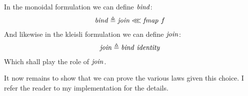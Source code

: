 In the monoidal formulation we can define $\mathit{bind}$:
%
\begin{align}
\mathit{bind} \mathrel{\triangleq} \mathit{join} \lll \mathit{fmap}\ f
\end{align}
%
And likewise in the kleisli formulation we can define $\mathit{join}$:
%
\begin{align}
\mathit{join} \mathrel{\triangleq} \mathit{bind}\ \mathit{identity}
\end{align}
%
Which shall play the role of $\mathit{join}$.

It now remains to show that we can prove the various laws given this choice. I
refer the reader to my implementation for the details.
